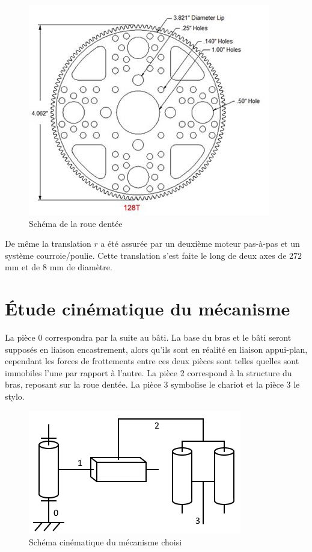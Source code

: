 \documentclass[12pt,a4paper]{report}
\begin{document}
\begin{figure}[!h]
 \center
 \includegraphics[scale=0.5]{../pictures/rouedentee2.jpg}
 \caption{Schéma de la roue dentée}
\end{figure}


De même la translation $r$ a été assurée par un deuxième moteur pas-à-pas et un système courroie/poulie. Cette translation s'est faite le long de deux axes de $272$ mm et de $8$ mm de diamètre.

	\section{Étude cinématique du mécanisme}
	La pièce 0 correspondra par la suite au bâti. La base du bras et le bâti seront supposés en liaison encastrement, alors qu'ils sont en réalité en liaison appui-plan, cependant les forces de frottements entre ces deux pièces sont telles quelles sont immobiles l'une par rapport à l'autre. La pièce 2 correspond à la structure du bras, reposant sur la roue dentée. La pièce 3 symbolise le chariot et la pièce 3 le stylo.

\begin{figure}[!h]
 \center
 \includegraphics[scale=1.1]{../pictures/schema_cinematique.png}
 \caption{Schéma cinématique du mécanisme choisi}
\end{figure}
\end{document}

